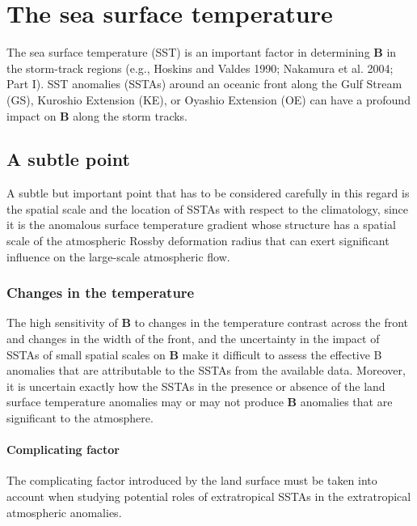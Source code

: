 \documentclass{ametsocv6.2}
\begin{document}
\section{The sea surface temperature}
The sea surface temperature
 (SST) is an important factor
in determining $\mathbf{B}$ in the storm-track regions (e.g.,
Hoskins and Valdes 1990; Nakamura et al. 2004; Part I).
SST anomalies (SSTAs) around an oceanic front along the
Gulf Stream (GS), Kuroshio Extension (KE), or Oyashio
Extension (OE) can have a profound impact on $\mathbf{B}$ along
the storm tracks. 

\subsection{A subtle point}
A subtle but important point that has to
be considered carefully in this regard is the spatial scale
and the location of SSTAs with respect to the climatology,
since it is the anomalous surface temperature
gradient whose structure has a spatial scale of the atmospheric
Rossby deformation radius that can exert significant
influence on the large-scale atmospheric flow. 

\subsubsection{Changes in the temperature}
The
high sensitivity of $\mathbf{B}$ to changes in the temperature contrast
across the front and changes in the width of the front, and
the uncertainty in the impact of SSTAs of small spatial
scales on $\mathbf{B}$ make it difficult to assess the effective B
anomalies that are attributable to the SSTAs from the
available data. Moreover, it is uncertain exactly how the
SSTAs in the presence or absence of the land surface
temperature anomalies may or may not produce $\mathbf{B}$ anomalies
that are significant to the atmosphere. 

\paragraph{Complicating factor}The complicating
factor introduced by the land surface must be taken
into account when studying potential roles of extratropical
SSTAs in the extratropical atmospheric anomalies.
\end{document}
